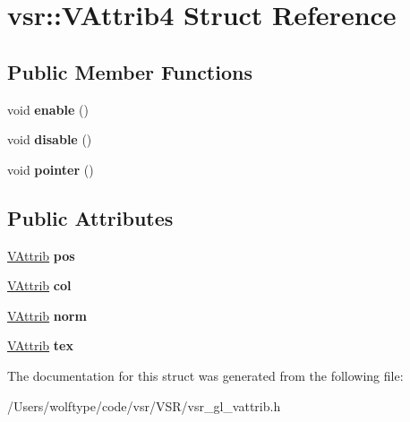 \hypertarget{structvsr_1_1_v_attrib4}{\section{vsr\-:\-:V\-Attrib4 Struct Reference}
\label{structvsr_1_1_v_attrib4}
}
\subsection*{Public Member Functions}
\begin{DoxyCompactItemize}
\item 
\hypertarget{structvsr_1_1_v_attrib4_a9790a6d37349369799df74b606ad53a0}{void {\bfseries enable} ()}\label{structvsr_1_1_v_attrib4_a9790a6d37349369799df74b606ad53a0}

\item 
\hypertarget{structvsr_1_1_v_attrib4_ae194eff05ea86565d55904231cbc9465}{void {\bfseries disable} ()}\label{structvsr_1_1_v_attrib4_ae194eff05ea86565d55904231cbc9465}

\item 
\hypertarget{structvsr_1_1_v_attrib4_a176e320fa61bad6418911aaf6170e2f9}{void {\bfseries pointer} ()}\label{structvsr_1_1_v_attrib4_a176e320fa61bad6418911aaf6170e2f9}

\end{DoxyCompactItemize}
\subsection*{Public Attributes}
\begin{DoxyCompactItemize}
\item 
\hypertarget{structvsr_1_1_v_attrib4_a2197b47bb9859d5273b5f35e0d86ea19}{\hyperlink{classvsr_1_1_v_attrib}{V\-Attrib} {\bfseries pos}}\label{structvsr_1_1_v_attrib4_a2197b47bb9859d5273b5f35e0d86ea19}

\item 
\hypertarget{structvsr_1_1_v_attrib4_a87e4cce2c709f6e4f39676eb9ffcb9b6}{\hyperlink{classvsr_1_1_v_attrib}{V\-Attrib} {\bfseries col}}\label{structvsr_1_1_v_attrib4_a87e4cce2c709f6e4f39676eb9ffcb9b6}

\item 
\hypertarget{structvsr_1_1_v_attrib4_aea9f5057511baa8da8488b15b88b68eb}{\hyperlink{classvsr_1_1_v_attrib}{V\-Attrib} {\bfseries norm}}\label{structvsr_1_1_v_attrib4_aea9f5057511baa8da8488b15b88b68eb}

\item 
\hypertarget{structvsr_1_1_v_attrib4_af37232fa1c1b9a2d7487b5620080436a}{\hyperlink{classvsr_1_1_v_attrib}{V\-Attrib} {\bfseries tex}}\label{structvsr_1_1_v_attrib4_af37232fa1c1b9a2d7487b5620080436a}

\end{DoxyCompactItemize}


The documentation for this struct was generated from the following file\-:\begin{DoxyCompactItemize}
\item 
/\-Users/wolftype/code/vsr/\-V\-S\-R/vsr\-\_\-gl\-\_\-vattrib.\-h\end{DoxyCompactItemize}
